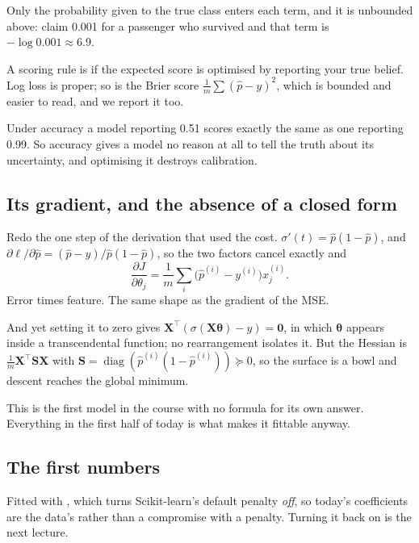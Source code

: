 \documentclass[11pt,a4paper]{article}
\begin{document}
Only the probability given to the true class enters each term, and it is
unbounded above: claim 0.001 for a passenger who survived and that term is
$-\log 0.001 \approx 6.9$.

A scoring rule is  if the expected score is optimised by reporting
your true belief. Log loss is proper; so is the Brier score
$\frac{1}{m}\sum(\hat p - y)^2$, which is bounded and easier to read, and we
report it too.

\begin{failbox}[title={Failure condition --- accuracy is not proper}]
Under accuracy a model reporting 0.51 scores exactly the same as one reporting
0.99. So accuracy gives a model no reason at all to tell the truth about its
uncertainty, and optimising it destroys calibration.
\end{failbox}

\subsection{Its gradient, and the absence of a closed form}

Redo the one step of the derivation that used the cost.
$\sigma'(t) = \hat p(1-\hat p)$, and
$\partial\ell/\partial\hat p = (\hat p - y)/\hat p(1-\hat p)$, so the two
factors cancel exactly and
\[ \frac{\partial J}{\partial\theta_j}
   = \frac{1}{m}\sum_i \bigl(\hat p^{(i)} - y^{(i)}\bigr)x_j^{(i)}. \]
Error times feature. The same shape as the gradient of the MSE.

And yet setting it to zero gives $\mathbf{X}^{\intercal}(\sigma(\mathbf{X}
\boldsymbol\theta) - y) = \mathbf{0}$, in which $\boldsymbol\theta$ appears
inside a transcendental function; no rearrangement isolates it. But the Hessian
is $\frac{1}{m}\mathbf{X}^{\intercal}\mathbf{S}\mathbf{X}$ with $\mathbf{S} =
\operatorname{diag}(\hat p^{(i)}(1-\hat p^{(i)})) \succeq 0$, so the surface is
a bowl and descent reaches the global minimum.

This is the first model in the course with no formula for its own answer.
Everything in the first half of today is what makes it fittable anyway.

\subsection{The first numbers}

Fitted with , which turns Scikit-learn's default penalty
\emph{off}, so today's coefficients are the data's rather than a compromise
with a penalty. Turning it back on is the next lecture.
\end{document}
